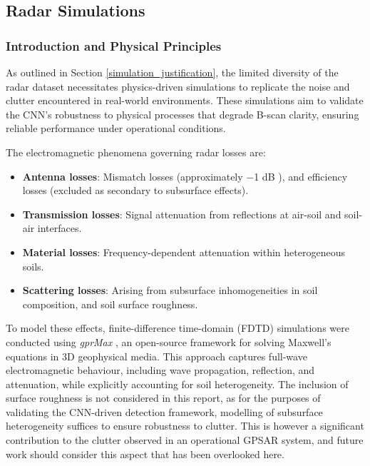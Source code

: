 \subsection{Radar Simulations} \label{compvis_radarsims}

    \subsubsection{Introduction and Physical Principles} \label{rory_radar_principles}
    
        As outlined in Section \ref{simulation_justification}, the limited diversity of the radar dataset necessitates physics-driven simulations to replicate the noise and clutter encountered in real-world environments. These simulations aim to validate the CNN’s robustness to physical processes that degrade B-scan clarity, ensuring reliable performance under operational conditions.
    
        The electromagnetic phenomena governing radar losses are:
        \begin{itemize}
        
            \item \textbf{Antenna losses}: Mismatch losses (approximately −1 dB \cite{daniels2005gpr}), and efficiency losses (excluded as secondary to subsurface effects).
            
            \item \textbf{Transmission losses}: Signal attenuation from reflections at air-soil and soil-air interfaces.
            
            \item \textbf{Material losses}: Frequency-dependent attenuation within heterogeneous soils.
            
            \item \textbf{Scattering losses}: Arising from subsurface inhomogeneities in soil composition, and soil surface roughness.
        
        \end{itemize}
        
        To model these effects, finite-difference time-domain (FDTD) simulations were conducted using \textit{gprMax} \cite{warren2016gprmax}, an open-source framework for solving Maxwell’s equations in 3D geophysical media. This approach captures full-wave electromagnetic behaviour, including wave propagation, reflection, and attenuation, while explicitly accounting for soil heterogeneity. The inclusion of surface roughness is not considered in this report, as for the purposes of validating the CNN-driven detection framework, modelling of subsurface heterogeneity suffices to ensure robustness to clutter. This is however a significant contribution to the clutter observed in an operational GPSAR system, and future work should consider this aspect that has been overlooked here.
     
